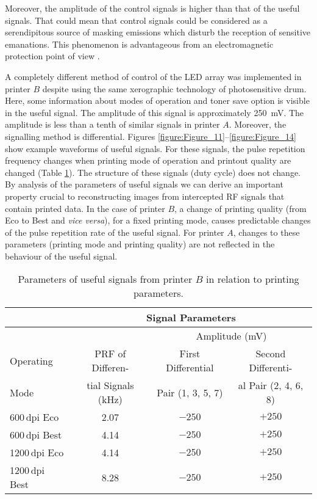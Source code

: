 \documentclass[12pt,a4paper]{article}
\begin{document}
Moreover, the amplitude of the control signals is higher than that of the
useful signals. That could mean that control signals could be considered as a
serendipitous source of masking emissions which disturb the reception of
sensitive emanations. This phenomenon is advantageous from an electromagnetic
protection point of view \cite{Ulas2016a,Guerrieri2018a,Loughry2002a}.

A completely different method of control of the LED array was implemented in
printer $B$ despite using the same xerographic technology of photosensitive
drum. Here, some information about modes of operation and toner save option is
visible in the useful signal. The amplitude of this signal is approximately
\SI{250}{\milli\volt}. The amplitude is less than a tenth of similar signals
in printer $A$. Moreover, the signalling method is differential.
Figures \ref{figure:Figure_11}--\ref{figure:Figure_14} show example waveforms
of useful signals. For these signals, the pulse repetition frequency changes
when printing mode of operation and printout quality are changed (Table
\ref{table:Table_2}). The structure of these signals (duty cycle) does not
change. By analysis of the parameters of useful signals we can derive an
important property crucial to reconstructing images from intercepted RF
signals that contain printed data. In the case of printer $B$, a change of
printing quality (from Eco to Best and {\it vice versa}), for a fixed
printing mode, causes predictable changes of the pulse repetition rate of the
useful signal. For printer $A$, changes to these parameters (printing mode
and printing quality) are not reflected in the behaviour of the useful
signal.

\begin{table}[!t]
    \centering
    \begin{tabular}{|l|c|c|c|}
        \hline
        & \multicolumn{3}{c|}{Signal Parameters} \\
        \hline
        & & \multicolumn{2}{c|}{Amplitude (\si{\milli\volt})} \\
        \hline
        Operating & PRF of Differen-
            & First Differential & Second Differenti- \\
        Mode & tial Signals (\si{\kilo\hertz})
            & Pair (1, 3, 5, 7) & al Pair (2, 4, 6, 8) \\
        \hline
        600\,dpi Eco   & 2.07 & $-250$ & $+250$ \\
        600\,dpi Best  & 4.14 & $-250$ & $+250$ \\
        1200\,dpi Eco  & 4.14 & $-250$ & $+250$ \\
        1200\,dpi Best & 8.28 & $-250$ & $+250$ \\
        \hline
    \end{tabular}
    \caption{Parameters of useful signals from printer $B$ in relation to
        printing parameters.}
    \label{table:Table_2}
\end{table}
\end{document}
